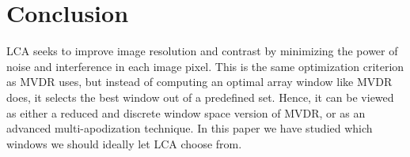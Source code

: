 \documentclass[10pt,journal,draftclsnofoot,onecolumn]{IEEEtran}
\let\MYoriglatexcaption\caption               %
\renewcommand{\caption}[2][\relax]{\MYoriglatexcaption[#2]{#2}}
\newcommand\Fig[1]{Fig.~\ref{#1}}
\newcommand\1{\vec 1}
\newcommand\minus{\scalebox{0.75}[1.0]{$-$}}
\begin{document}
% 
% 


\section{Conclusion}\label{sec:conclusion}


LCA seeks to improve image resolution and contrast by minimizing the power of noise and interference in each image pixel. This is the same optimization criterion as MVDR uses, but instead of computing an optimal array window like MVDR does, it selects the best window out of a predefined set. Hence, it can be viewed as either a reduced and discrete window space version of MVDR, or as an advanced multi-apodization technique. In this paper we have studied which windows we should ideally let LCA choose from.
\end{document}
